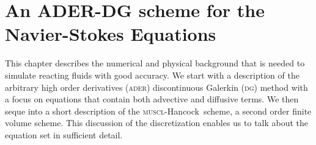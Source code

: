 
\newcommand{\Q}{\bm{Q}}
\newcommand{\gradQ}{\gradient{\Q}}
\newcommand{\Qrho}{\rho}
\newcommand{\Qj}{\rho \bm{v}}
\newcommand{\Qv}{\bm{v}}
\newcommand{\QE}{\rho E}
\newcommand{\QZZ}{Z} %
\newcommand{\QZ}{\rho \QZZ}
\newcommand{\potT}{\theta}
\newcommand{\backgroundPotT}{\overline{\theta}}
\newcommand{\pertubationPotT}{\theta'}
\newcommand{\stressT}{\bm{\sigma}}
\newcommand{\pressure}{p}
\newcommand{\maxConvEigen}[1][]{
  \vert%
  \lambda_c^{\text{max}}
  \notblank{#1}{\left(#1\right)}{}
  \vert%
}
\newcommand{\maxViscEigen}[1][]{
  \vert%
  \lambda_v^{\text{max}}
  \notblank{#1}{\left(#1\right)}{}
  \vert%
}
\newcommand{\Riemann}{\operatorname{Riemann}}

\newcommand{\domain}{\Omega}
\newcommand{\broken}{\domain}
\newcommand{\cell}[1][i]{C_{#1}}
\newcommand{\boundary}{\partial \domain}
\newcommand{\sbasis}[1]{\Phi_{#1}}
\newcommand{\stbasis}[1]{\Phi_{#1}}
\newcommand{\testfunction}[1]{\Phi_{#1}}
\newcommand{\normal}{\bm{n}}
\newcommand{\dsol}[1][h]{\bm{u}_{#1}}
\newcommand{\stpredictor}[1][h]{\bm{q}_{#1}}

\newcommand{\flux}{F}
\newcommand{\viscFlux}{\flux^{v}}
\newcommand{\hyperFlux}{\flux^{h}}
\newcommand{\source}{\bm{S}}

\newcommand{\intdt}[1]{\int_{t^n}^{t^{n+1}} #1 \dd{t}}
\newcommand{\intdcell}[1]{\int_{\cell} #1 \dd{\bm{x}}}
\newcommand{\intdcellb}[1]{\int_{\partial{} \cell} #1 \dd{S}} %

\newcommand{\muscl}{\textsc{muscl}-Hancock}
\newcommand{\dg}{\textsc{dg}}
\newcommand{\ader}{\textsc{ader}}
\newcommand{\aderdg}{\textsc{ader-dg}}
\newcommand{\amr}{\textsc{amr}}
\newcommand{\pde}{\textsc{pde}}

\chapter{An ADER-DG scheme for the Navier-Stokes Equations}\label{chap:methods}
This chapter describes the numerical and physical background that is needed to simulate reacting fluids with good accuracy.
We start with a description of the arbitrary high order derivatives (\ader) discontinuous Galerkin (\dg) method with a focus on equations that contain both advective and diffusive terms.
We then seque into a short description of the \muscl\ scheme, a second order finite volume scheme.
This discussion of the discretization enables us to talk about the equation set in sufficient detail.

